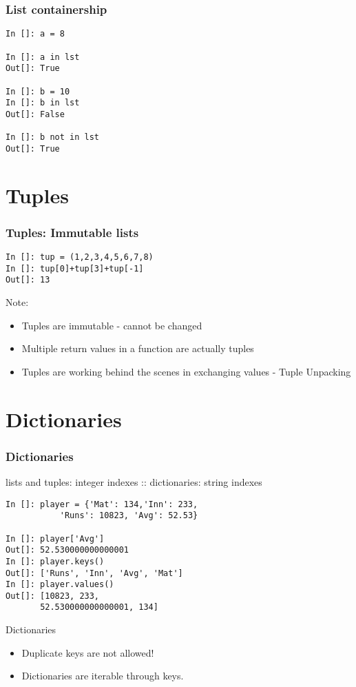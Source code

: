\documentclass[14pt,compress]{beamer}
\newcounter{time}
\newcommand{\inctime}[1]{\addtocounter{time}{#1}{\tiny \thetime\ m}}
\begin{document}
\begin{frame}[fragile]
\frametitle{List containership}
\begin{lstlisting}
In []: a = 8

In []: a in lst
Out[]: True

In []: b = 10
In []: b in lst
Out[]: False

In []: b not in lst
Out[]: True
\end{lstlisting}
\inctime{10}
\end{frame}

\section{Tuples}
\begin{frame}[fragile]
\frametitle{Tuples: Immutable lists}
\begin{lstlisting}
In []: tup = (1,2,3,4,5,6,7,8)
In []: tup[0]+tup[3]+tup[-1]
Out[]: 13
\end{lstlisting}
\begin{block}{Note:}
\begin{itemize}
\item Tuples are immutable - cannot be changed
\item Multiple return values in a function are actually tuples
\item Tuples are working behind the scenes in exchanging values - Tuple Unpacking
\end{itemize}
\end{block}
\inctime{5}
\end{frame}

\section{Dictionaries}
\begin{frame}[fragile]
\frametitle{Dictionaries}
  \alert {lists and tuples: integer indexes :: dictionaries: string indexes}
\begin{lstlisting}
In []: player = {'Mat': 134,'Inn': 233, 
           'Runs': 10823, 'Avg': 52.53}

In []: player['Avg']
Out[]: 52.530000000000001
In []: player.keys()
Out[]: ['Runs', 'Inn', 'Avg', 'Mat']
In []: player.values()
Out[]: [10823, 233, 
       52.530000000000001, 134]
\end{lstlisting}
\end{frame}

\begin{frame}{Dictionaries}
\begin{itemize}
\item Duplicate keys are not allowed!
\item Dictionaries are iterable through keys.
\end{itemize}
\inctime{5}
\end{frame}
\end{document}
